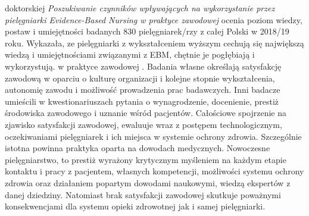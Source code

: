\documentclass[a4paper,12pt,twoside,openright]{mwrep}
\begin{document}
doktorskiej \textit{ Poszukiwanie czynników wpływających na wykorzystanie przez pielęgniarki Evidence-Based Nursing w praktyce zawodowej} ocenia poziom wiedzy, postaw i umiejętności badanych 830 pielęgniarek/rzy z całej Polski  w 2018/19 roku. Wykazała, ze pielęgniarki z wykształceniem wyższym cechują się największą wiedzą i umiejętnościami związanymi z EBM, chętnie je  pogłębiają i wykorzystują. w praktyce zawodowej \cite{EBM}. Badania własne określają satysfakcję zawodową w oparciu o kulturę organizacji i kolejne stopnie wykształcenia, autonomię zawodu i możliwość prowadzenia prac badawczych. Inni badacze umieścili w kwestionariuszach pytania o wynagrodzenie, docenienie, prestiż środowiska zawodowego i uznanie wśród pacjentów. Całościowe spojrzenie na zjawisko satysfakcji zawodowej, ewaluuje wraz z postępem technologicznym, oczekiwaniami pielęgniarek i ich miejsca w systemie ochrony zdrowia. Szczególnie istotna powinna praktyka oparta na dowodach medycznych. Nowoczesne pielęgniarstwo, to prestiż wyrażony krytycznym myśleniem na każdym etapie kontaktu i pracy z pacjentem, własnych kompetencji, możliwości systemu ochrony zdrowia oraz działaniem popartym dowodami naukowymi, wiedzą ekspertów z danej dziedziny. Natomiast brak satysfakcji zawodowej skutkuje poważnymi konsekwencjami dla systemu opieki zdrowotnej jak i samej pielęgniarki.
\end{document}
